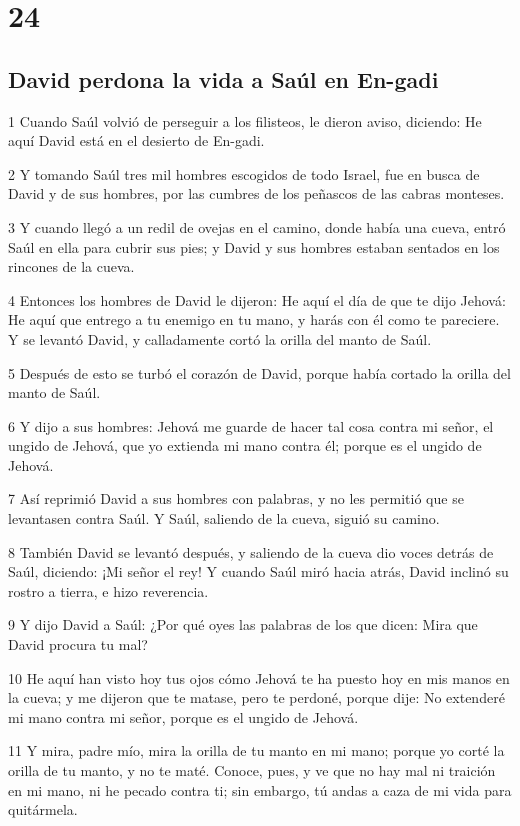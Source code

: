 \chapter{24}

\section*{David perdona la vida a Saúl en En-gadi}

\par 1 Cuando Saúl volvió de perseguir a los filisteos, le dieron aviso, diciendo: He aquí David está en el desierto de En-gadi.
\par 2 Y tomando Saúl tres mil hombres escogidos de todo Israel, fue en busca de David y de sus hombres, por las cumbres de los peñascos de las cabras monteses.
\par 3 Y cuando llegó a un redil de ovejas en el camino, donde había una cueva, entró Saúl en ella para cubrir sus pies; y David y sus hombres estaban sentados en los rincones de la cueva.
\par 4 Entonces los hombres de David le dijeron: He aquí el día de que te dijo Jehová: He aquí que entrego a tu enemigo en tu mano, y harás con él como te pareciere. Y se levantó David, y calladamente cortó la orilla del manto de Saúl.
\par 5 Después de esto se turbó el corazón de David, porque había cortado la orilla del manto de Saúl.
\par 6 Y dijo a sus hombres: Jehová me guarde de hacer tal cosa contra mi señor, el ungido de Jehová, que yo extienda mi mano contra él; porque es el ungido de Jehová.
\par 7 Así reprimió David a sus hombres con palabras, y no les permitió que se levantasen contra Saúl. Y Saúl, saliendo de la cueva, siguió su camino.
\par 8 También David se levantó después, y saliendo de la cueva dio voces detrás de Saúl, diciendo: ¡Mi señor el rey! Y cuando Saúl miró hacia atrás, David inclinó su rostro a tierra, e hizo reverencia.
\par 9 Y dijo David a Saúl: ¿Por qué oyes las palabras de los que dicen: Mira que David procura tu mal?
\par 10 He aquí han visto hoy tus ojos cómo Jehová te ha puesto hoy en mis manos en la cueva; y me dijeron que te matase, pero te perdoné, porque dije: No extenderé mi mano contra mi señor, porque es el ungido de Jehová.
\par 11 Y mira, padre mío, mira la orilla de tu manto en mi mano; porque yo corté la orilla de tu manto, y no te maté. Conoce, pues, y ve que no hay mal ni traición en mi mano, ni he pecado contra ti; sin embargo, tú andas a caza de mi vida para quitármela.

